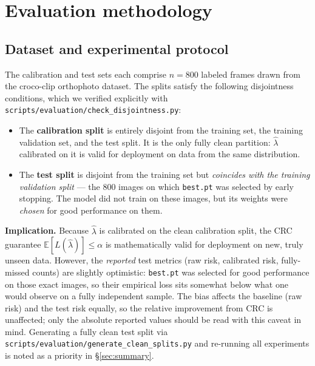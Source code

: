 \documentclass[11pt,a4paper]{article}
\newcommand{\lamhat}{\hat{\lambda}}
\newcommand{\code}[1]{\texttt{\small #1}}
\begin{document}
\section{Evaluation methodology}

\subsection{Dataset and experimental protocol}

The calibration and test sets each comprise $n{=}800$ labeled frames drawn from
the croco-clip orthophoto dataset. The splits satisfy the following disjointness
conditions, which we verified explicitly with \code{scripts/evaluation/check\_disjointness.py}:

\begin{itemize}[nosep]
  \item The \textbf{calibration split} is entirely disjoint from the training set,
    the training validation set, and the test split. It is the only fully clean
    partition: $\lamhat$ calibrated on it is valid for deployment on data from the
    same distribution.
  \item The \textbf{test split} is disjoint from the training set but \emph{coincides
    with the training validation split} --- the $800$ images on which
    \code{best.pt} was selected by early stopping. The model did not train on
    these images, but its weights were \emph{chosen} for good performance on them.
\end{itemize}

\noindent\textbf{Implication.} Because $\lamhat$ is calibrated on the clean
calibration split, the CRC guarantee $\mathbb{E}[L(\lamhat)]\le\alpha$ is
mathematically valid for deployment on new, truly unseen data. However, the
\emph{reported} test metrics (raw risk, calibrated risk, fully-missed counts) are
slightly optimistic: \code{best.pt} was selected for good performance on those
exact images, so their empirical loss sits somewhat below what one would observe
on a fully independent sample. The bias affects the baseline (raw risk) and
the test risk equally, so the relative improvement from CRC is unaffected; only
the absolute reported values should be read with this caveat in mind. Generating
a fully clean test split via \code{scripts/evaluation/generate\_clean\_splits.py}
and re-running all experiments is noted as a priority in \S\ref{sec:summary}.
\end{document}
